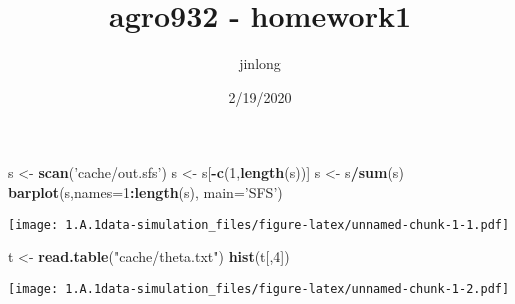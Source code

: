 \documentclass[]{article}
\title{agro932 - homework1}
\author{jinlong}
\date{2/19/2020}
\newenvironment{Shaded}{\begin{snugshade}}{\end{snugshade}}
\newcommand{\CommentTok}[1]{\textcolor[rgb]{0.56,0.35,0.01}{\textit{#1}}}
\newcommand{\DataTypeTok}[1]{\textcolor[rgb]{0.13,0.29,0.53}{#1}}
\newcommand{\DecValTok}[1]{\textcolor[rgb]{0.00,0.00,0.81}{#1}}
\newcommand{\KeywordTok}[1]{\textcolor[rgb]{0.13,0.29,0.53}{\textbf{#1}}}
\newcommand{\NormalTok}[1]{#1}
\newcommand{\OperatorTok}[1]{\textcolor[rgb]{0.81,0.36,0.00}{\textbf{#1}}}
\newcommand{\OtherTok}[1]{\textcolor[rgb]{0.56,0.35,0.01}{#1}}
\newcommand{\StringTok}[1]{\textcolor[rgb]{0.31,0.60,0.02}{#1}}
\begin{document}
\maketitle

\begin{Shaded}
\end{Shaded}

\begin{Shaded}
\begin{Highlighting}[]
\NormalTok{s <-}\StringTok{ }\KeywordTok{scan}\NormalTok{(}\StringTok{'cache/out.sfs'}\NormalTok{)}
\NormalTok{s <-}\StringTok{ }\NormalTok{s[}\OperatorTok{-}\KeywordTok{c}\NormalTok{(}\DecValTok{1}\NormalTok{,}\KeywordTok{length}\NormalTok{(s))]}
\NormalTok{s <-}\StringTok{ }\NormalTok{s}\OperatorTok{/}\KeywordTok{sum}\NormalTok{(s)}
\KeywordTok{barplot}\NormalTok{(s,}\DataTypeTok{names=}\DecValTok{1}\OperatorTok{:}\KeywordTok{length}\NormalTok{(s), }\DataTypeTok{main=}\StringTok{'SFS'}\NormalTok{)}
\end{Highlighting}
\end{Shaded}

\texttt{[image: 1.A.1data-simulation\_files/figure-latex/unnamed-chunk-1-1.pdf]}

\begin{Shaded}
\begin{Highlighting}[]
\NormalTok{t <-}\StringTok{ }\KeywordTok{read.table}\NormalTok{(}\StringTok{"cache/theta.txt"}\NormalTok{)}
\KeywordTok{hist}\NormalTok{(t[,}\DecValTok{4}\NormalTok{])}
\end{Highlighting}
\end{Shaded}

\texttt{[image: 1.A.1data-simulation\_files/figure-latex/unnamed-chunk-1-2.pdf]}
\end{document}
